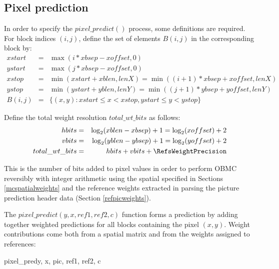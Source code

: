 \subsection{Pixel prediction}
\label{pixelpredict}

In order to specify the $pixel\_predict()$ process, some definitions are required. For block indices $(i,j)$, 
define the set of elements $B(i,j)$ in the corresponding
block by:
\begin{eqnarray*}
xstart & = & \max(i*xbsep-xoffset, 0) \\
ystart & = & \max(j*xbsep-xoffset, 0) \\
xstop & = & \min\left( xstart+xblen, lenX\right)= \min\left( (i+1)*xbsep+xoffset, lenX\right)\\
ystop & = & \min\left( ystart+yblen, lenY\right)= \min\left( (j+1)*ybsep+yoffset, lenY\right)\\
B(i,j) & = & \{(x,y): xstart\leq x<xstop, ystart\leq y<ystop\}
\end{eqnarray*}

Define the total weight resolution $total\_wt\_bits$ as follows: 
\begin{eqnarray*}
hbits  & = & \log_2(xblen-xbsep)+1 = \log_2(xoffset)+2 \\
vbits  & = & \log_2(yblen-ybsep)+1 = \log_2(yoffset)+2 \\
total\_wt\_bits & = & hbits+vbits+\RefsWeightPrecision
\end{eqnarray*}

This is the number of bits added to pixel values in order to perform OBMC reversibly with integer arithmetic
using the spatial specified in Sections \ref{mcspatialweights} and the reference weights extracted in
parsing the picture prediction header data (Section \ref{refpicweights}).

The $pixel\_predict(y, x, ref1, ref2, c)$ function forms a prediction by adding together weighted predictions
for all blocks containing the pixel $(x,y)$. Weight contributions come both from a spatial matrix and from the
weights assigned to references:

\begin{pseudo}{pixel\_pred}{y, x, pic, ref1, ref2, c}
   \bsELSE
    \bsEND{}
\bsEND
{}
\end{pseudo}


